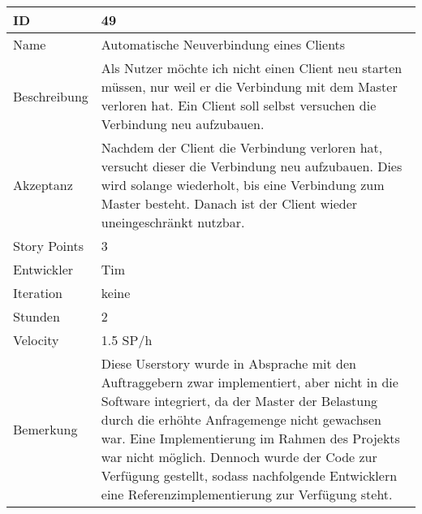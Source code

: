 \begin{table}[htbp]
\begin{minipage}{\linewidth}
\setlength{\tymax}{0.5\linewidth}
\centering
\small
\begin{tabulary}{\textwidth}{|l|p{10cm}|} \hline
 ID   &49\\\hline
Name  &Automatische Neuverbindung eines Clients\\\hline
Beschreibung&Als Nutzer möchte ich nicht einen Client neu starten müssen, nur weil er die Verbindung mit dem Master verloren hat. Ein Client soll selbst versuchen die Verbindung neu aufzubauen.\\\hline
Akzeptanz &Nachdem der Client die Verbindung verloren hat, versucht dieser die Verbindung neu aufzubauen. Dies wird solange wiederholt, bis eine Verbindung zum Master besteht. Danach ist der Client wieder uneingeschränkt nutzbar.\\\hline
Story Points&3\\\hline
Entwickler &Tim\\\hline
Iteration &keine\\\hline
Stunden  &2\\\hline
Velocity &1.5 SP\slash h\\\hline
Bemerkung & Diese Userstory wurde in Absprache mit den Auftraggebern zwar implementiert, aber nicht in die Software integriert, da der Master der Belastung durch die erhöhte Anfragemenge nicht gewachsen war. Eine Implementierung im Rahmen des Projekts war nicht möglich. Dennoch wurde der Code zur Verfügung gestellt, sodass nachfolgende Entwicklern eine Referenzimplementierung zur Verfügung steht.\\\hline
\end{tabulary}
\end{minipage}
\end{table}
